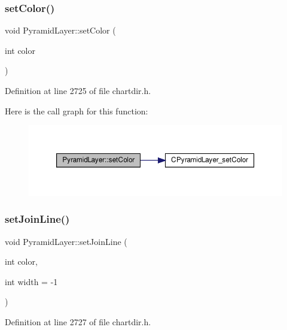 \subsubsection{\texorpdfstring{set\+Color()}{setColor()}}
{\footnotesize\ttfamily void Pyramid\+Layer\+::set\+Color (\begin{DoxyParamCaption}\item[{int}]{color }\end{DoxyParamCaption})\hspace{0.3cm}{\ttfamily [inline]}}



Definition at line 2725 of file chartdir.\+h.

Here is the call graph for this function\+:
\nopagebreak
\begin{figure}[H]
\begin{center}
\leavevmode
\includegraphics[width=350pt]{class_pyramid_layer_a01e46a444b4b81a0753aa6068e88e94d_cgraph}
\end{center}
\end{figure}
\mbox{\label{class_pyramid_layer_ae9339f4fc54d82299e5d392ccbe87af3}} 
\subsubsection{\texorpdfstring{set\+Join\+Line()}{setJoinLine()}}
{\footnotesize\ttfamily void Pyramid\+Layer\+::set\+Join\+Line (\begin{DoxyParamCaption}\item[{int}]{color,  }\item[{int}]{width = {\ttfamily -\/1} }\end{DoxyParamCaption})\hspace{0.3cm}{\ttfamily [inline]}}



Definition at line 2727 of file chartdir.\+h.

